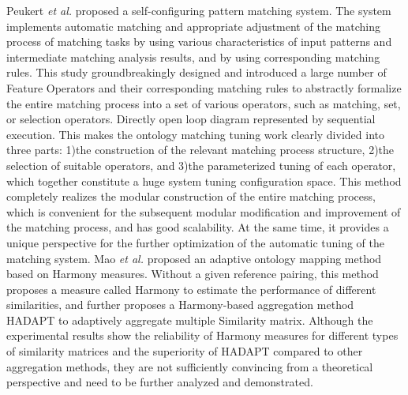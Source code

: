 \documentclass[twoside]{article}
\begin{document}
\begin{multicols}{2}
Peukert {\it et al.} proposed a self-configuring pattern matching system. 
The system implements automatic matching and appropriate adjustment of the matching process of matching tasks by using various characteristics of input patterns and intermediate matching analysis results, and by using corresponding matching rules. 
This study groundbreakingly designed and introduced a large number of Feature Operators and their corresponding matching rules to abstractly formalize the entire matching process into a set of various operators, such as matching, set, or selection operators. 
Directly open loop diagram represented by sequential execution. This makes the ontology matching tuning work clearly divided into three parts: 1)the construction of the relevant matching process structure, 2)the selection of suitable operators, and 3)the parameterized tuning of each operator, which together constitute a huge system tuning configuration space. 
This method completely realizes the modular construction of the entire matching process, which is convenient for the subsequent modular modification and improvement of the matching process, and has good scalability. At the same time, it provides a unique perspective for the further optimization of the automatic tuning of the matching system. 
Mao {\it et al.} proposed an adaptive ontology mapping method based on Harmony measures\cite{wwy43}. Without a given reference pairing, this method proposes a measure called Harmony to estimate the performance of different similarities, and further proposes a Harmony-based aggregation method HADAPT to adaptively aggregate multiple Similarity matrix. Although the experimental results show the reliability of Harmony measures for different types of similarity matrices and the superiority of HADAPT compared to other aggregation methods, they are not sufficiently convincing from a theoretical perspective and need to be further analyzed and demonstrated.


\end{multicols}
\end{document}
